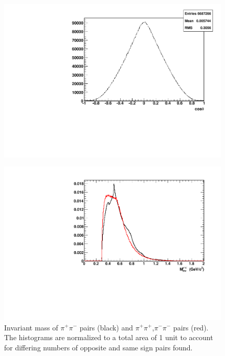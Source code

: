 \documentclass[abstract = on,listof=totoc, bibliography=totoc]{scrreprt}
\newcommand{\pip}{\pi^+}
\newcommand{\pim}{\pi^-}
\newcommand{\pair}{$\pip\pim$ }
\begin{document}
\begin{figure}
\begin{center}
\includegraphics[width = .8\textwidth]{hCosTheta}
\caption[$\cos\theta$ distribution of \pair pair]{}
\label{fig:cosTheta}
\end{center}
\end{figure}


\begin{figure}
\begin{center}
\includegraphics[width = 1\textwidth]{invMassSameVsOpp4}
\caption[Invariant mass of opposite and same sign pion pairs]{Invariant mass of \pair pairs (black) and $\pi^+\pi^+$,$\pi^-\pi^-$ pairs (red). The histograms are normalized to a total area of 1 unit to account for differing numbers of opposite and same sign pairs found.}
\label{fig:invMSO}
\end{center}
\end{figure}
\end{document}
